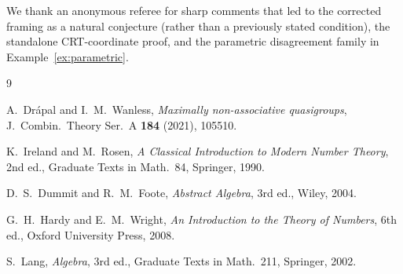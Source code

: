 \documentclass[11pt,reqno]{amsart}
\theoremstyle{plain}
\theoremstyle{definition}
\begin{document}
We thank an anonymous referee for sharp comments that led to the corrected framing as a natural conjecture (rather than a previously stated condition), the standalone CRT-coordinate proof, and the parametric disagreement family in Example~\ref{ex:parametric}.

\begin{thebibliography}{9}

A.~Drápal and I.~M.~Wanless,
\emph{Maximally non-associative quasigroups},
J.\ Combin.\ Theory Ser.\ A \textbf{184} (2021), 105510.

K.~Ireland and M.~Rosen,
\emph{A Classical Introduction to Modern Number Theory}, 2nd ed.,
Graduate Texts in Math.\ 84, Springer, 1990.

D.~S.~Dummit and R.~M.~Foote,
\emph{Abstract Algebra}, 3rd ed.,
Wiley, 2004.

G.~H.~Hardy and E.~M.~Wright,
\emph{An Introduction to the Theory of Numbers}, 6th ed.,
Oxford University Press, 2008.

S.~Lang,
\emph{Algebra}, 3rd ed.,
Graduate Texts in Math.\ 211, Springer, 2002.

\end{thebibliography}
\end{document}
